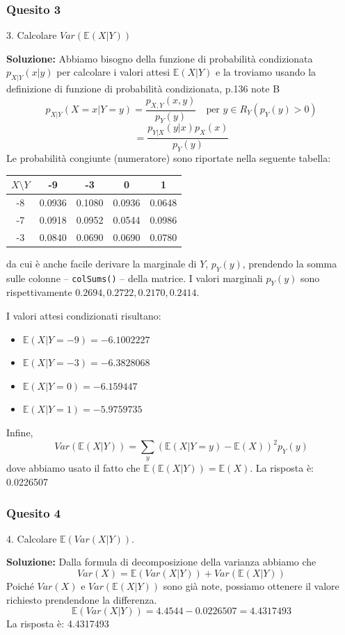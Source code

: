 \documentclass[12pt, a4paper]{article}
\begin{document}
\newpage

\subsubsection*{Quesito 3}
3. Calcolare $Var(\mathbb{E}(X|Y))$

\textbf{Soluzione:}
Abbiamo bisogno della funzione di probabilità condizionata $p_{X|Y}(x|y)$ per calcolare i valori attesi $\mathbb{E}(X|Y)$ e la troviamo usando la definizione di funzione di probabilità condizionata, p.136 note B
$$ p_{X|Y}(X=x|Y=y) = \frac{p_{X,Y}(x,y)}{p_Y(y)} \quad \text{per } y \in R_Y(p_Y(y)>0) $$
$$ = \frac{p_{Y|X}(y|x)p_X(x)}{p_Y(y)} $$
Le probabilità congiunte (numeratore) sono riportate nella seguente tabella:
\begin{center}
\begin{tabular}{c|cccc}
\toprule
$X \setminus Y$ & -9 & -3 & 0 & 1 \\
\midrule
-8 & 0.0936 & 0.1080 & 0.0936 & 0.0648 \\
-7 & 0.0918 & 0.0952 & 0.0544 & 0.0986 \\
-3 & 0.0840 & 0.0690 & 0.0690 & 0.0780 \\
\bottomrule
\end{tabular}
\end{center}
da cui è anche facile derivare la marginale di $Y$, $p_Y(y)$, prendendo la somma sulle colonne – \texttt{colSums()} – della matrice. I valori marginali $p_Y(y)$ sono rispettivamente $0.2694, 0.2722, 0.2170, 0.2414$.

I valori attesi condizionati risultano:
\begin{itemize}
    \item $\mathbb{E}(X|Y=-9) = -6.1002227$
    \item $\mathbb{E}(X|Y=-3) = -6.3828068$
    \item $\mathbb{E}(X|Y=0) = -6.159447$
    \item $\mathbb{E}(X|Y=1) = -5.9759735$
\end{itemize}
Infine, 
$$ Var(\mathbb{E}(X|Y)) = \sum_y (\mathbb{E}(X|Y=y) - \mathbb{E}(X))^2 p_Y(y) $$
dove abbiamo usato il fatto che $\mathbb{E}(\mathbb{E}(X|Y)) = \mathbb{E}(X)$.
La risposta è: 0.0226507

\subsubsection*{Quesito 4}
4. Calcolare $\mathbb{E}(Var(X|Y))$.

\textbf{Soluzione:}
Dalla formula di decomposizione della varianza abbiamo che 
$$ Var(X) = \mathbb{E}(Var(X|Y)) + Var(\mathbb{E}(X|Y)) $$
Poiché $Var(X)$ e $Var(\mathbb{E}(X|Y))$ sono già note, possiamo ottenere il valore richiesto prendendone la differenza.
$$ \mathbb{E}(Var(X|Y)) = 4.4544 - 0.0226507 = 4.4317493 $$
La risposta è: 4.4317493
\end{document}
